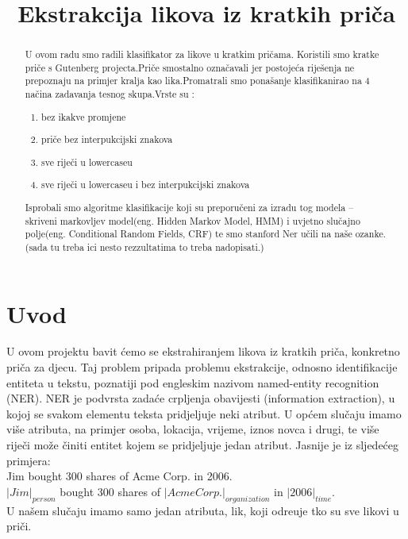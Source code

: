 \documentclass[conference]{IEEEtran}
\begin{document}
\title{Ekstrakcija likova iz kratkih pri\v{c}a}
\author{
\and
{}}
\maketitle

\begin{abstract}
U ovom radu smo radili klasifikator za likove u kratkim pri\v{c}ama. Koristili smo kratke pri\v{c}e s Gutenberg projecta.Pri\v{c}e smostalno ozna\v{c}avali jer postoje\'ca rije\v{s}enja ne prepoznaju na primjer kralja kao lika.Promatrali smo pona\v{s}anje klasifikanirao na 4 na\v{c}ina zadavanja tesnog skupa.Vrste su :
\begin{enumerate}
\item bez ikakve promjene
\item pri\v{c}e bez interpukcijski znakova
\item sve rije\v{c}i u lowercaseu
\item sve rije\v{c}i u lowercaseu i bez interpukcijski znakova
\end{enumerate} 
Isprobali smo algoritme klasifikacije koji su preporu\v{c}eni za izradu tog modela -- skriveni markovljev model(eng. Hidden Markov Model, HMM) i uvjetno slu\v{c}ajno polje(eng. Conditional Random Fields, CRF) te smo  stanford Ner u\v{c}ili na na\v{s}e ozanke.
(sada tu treba ici nesto  rezzultatima to treba nadopisati.)     
\end{abstract}
\section{Uvod}
U ovom projektu bavit \'cemo se ekstrahiranjem likova iz kratkih pri\v{c}a, konkretno pri\v{c}a za djecu. Taj problem pripada problemu ekstrakcije, odnosno identifikacije entiteta u tekstu, poznatiji pod engleskim nazivom named-entity recognition (NER). NER je podvrsta zada\'ce crpljenja obavijesti (information
extraction), u kojoj se svakom elementu teksta pridjeljuje neki atribut. U op\'cem
slučaju imamo vi\v{s}e atributa, na primjer osoba, lokacija, vrijeme, iznos novca i
drugi, te vi\v{s}e rije\v{c}i mo\v{z}e \v{c}initi entitet kojem se pridjeljuje jedan atribut. Jasnije
je iz sljede\'ceg primjera:\\
Jim bought 300 shares of Acme Corp. in 2006.\\
$|Jim|_{person}$ bought 300 shares of $|Acme Corp.|_{organization}$ in $|2006|_{time}$.\\
U na\v{s}em slu\v{c}aju imamo samo jedan atributa, lik, koji odre\dj{}uje tko su sve likovi u pri\v{c}i.
\end{document}
